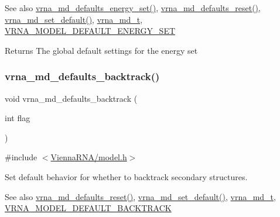 \begin{DoxySeeAlso}{See also}
\hyperlink{group__model__details_ga8dd29c55787a4576277e1907e92d810c}{vrna\+\_\+md\+\_\+defaults\+\_\+energy\+\_\+set()}, \hyperlink{group__model__details_ga70834424cf804d149937de89f80ceb45}{vrna\+\_\+md\+\_\+defaults\+\_\+reset()}, \hyperlink{group__model__details_ga8ac6ff84936282436f822644bf841f66}{vrna\+\_\+md\+\_\+set\+\_\+default()}, \hyperlink{group__model__details_ga1f8a10e12a0a1915f2a4eff0b28ea17c}{vrna\+\_\+md\+\_\+t}, \hyperlink{group__model__details_ga6fcf6b2d0f89256cdbd166486c9b6e1e}{V\+R\+N\+A\+\_\+\+M\+O\+D\+E\+L\+\_\+\+D\+E\+F\+A\+U\+L\+T\+\_\+\+E\+N\+E\+R\+G\+Y\+\_\+\+S\+ET} 
\end{DoxySeeAlso}
\begin{DoxyReturn}{Returns}
The global default settings for the energy set 
\end{DoxyReturn}
\mbox{\label{group__model__details_ga978c468b2fe96a70d5191e3dd17d5599}} 
\subsubsection{\texorpdfstring{vrna\+\_\+md\+\_\+defaults\+\_\+backtrack()}{vrna\_md\_defaults\_backtrack()}}
{\footnotesize\ttfamily void vrna\+\_\+md\+\_\+defaults\+\_\+backtrack (\begin{DoxyParamCaption}\item[{int}]{flag }\end{DoxyParamCaption})}



{\ttfamily \#include $<$\hyperlink{model_8h}{Vienna\+R\+N\+A/model.\+h}$>$}



Set default behavior for whether to backtrack secondary structures. 

\begin{DoxySeeAlso}{See also}
\hyperlink{group__model__details_ga70834424cf804d149937de89f80ceb45}{vrna\+\_\+md\+\_\+defaults\+\_\+reset()}, \hyperlink{group__model__details_ga8ac6ff84936282436f822644bf841f66}{vrna\+\_\+md\+\_\+set\+\_\+default()}, \hyperlink{group__model__details_ga1f8a10e12a0a1915f2a4eff0b28ea17c}{vrna\+\_\+md\+\_\+t}, \hyperlink{group__model__details_ga3fda8006ab84baf817bd8e5ccbc6bb35}{V\+R\+N\+A\+\_\+\+M\+O\+D\+E\+L\+\_\+\+D\+E\+F\+A\+U\+L\+T\+\_\+\+B\+A\+C\+K\+T\+R\+A\+CK} 
\end{DoxySeeAlso}

